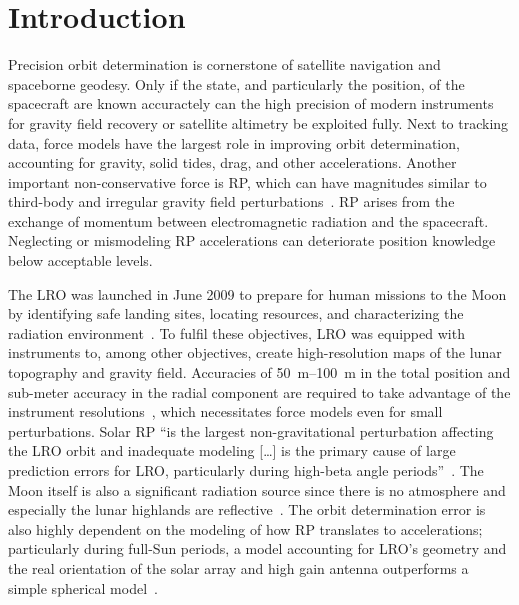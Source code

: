 \section{Introduction}
\label{sec:introduction}

Precision orbit determination is cornerstone of satellite navigation and spaceborne geodesy. Only if the state, and particularly the position, of the spacecraft are known accuractely can the high precision of modern instruments for gravity field recovery or satellite altimetry be exploited fully. Next to tracking data, force models have the largest role in improving orbit determination, accounting for gravity, solid tides, drag, and other accelerations. Another important non-conservative force is \acrfull{RP}, which can have magnitudes similar to third-body and irregular gravity field perturbations~\cite{Montenbruck2000}. \gls{RP} arises from the exchange of momentum between electromagnetic radiation and the spacecraft. Neglecting or mismodeling \gls{RP} accelerations can deteriorate position knowledge below acceptable levels.

The \acrfull{LRO} was launched in June 2009 to prepare for human missions to the Moon by identifying safe landing sites, locating resources, and characterizing the radiation environment~\cite{Tooley2010}. To fulfil these objectives, \gls{LRO} was equipped with instruments to, among other objectives, create high-resolution maps of the lunar topography and gravity field. Accuracies of \qtyrange{50}{100}{\m} in the total position and sub-meter accuracy in the radial component are required to take advantage of the instrument resolutions~\cite{Chin2007,Zuber2009}, which necessitates force models even for small perturbations. Solar \gls{RP} \enquote{is the largest non-gravitational perturbation affecting the LRO orbit and inadequate modeling [\ldots] is the primary cause of large prediction errors for LRO, particularly during high-beta angle periods}~\cite{Slojkowski2015}. The Moon itself is also a significant radiation source since there is no atmosphere and especially the lunar highlands are reflective~\cite{Floberghagen1999}. The orbit determination error is also highly dependent on the modeling of how \gls{RP} translates to accelerations; particularly during full-Sun periods, a model accounting for \gls{LRO}'s geometry and the real orientation of the solar array and high gain antenna outperforms a simple spherical model~\cite{Slojkowski2014}.
 
